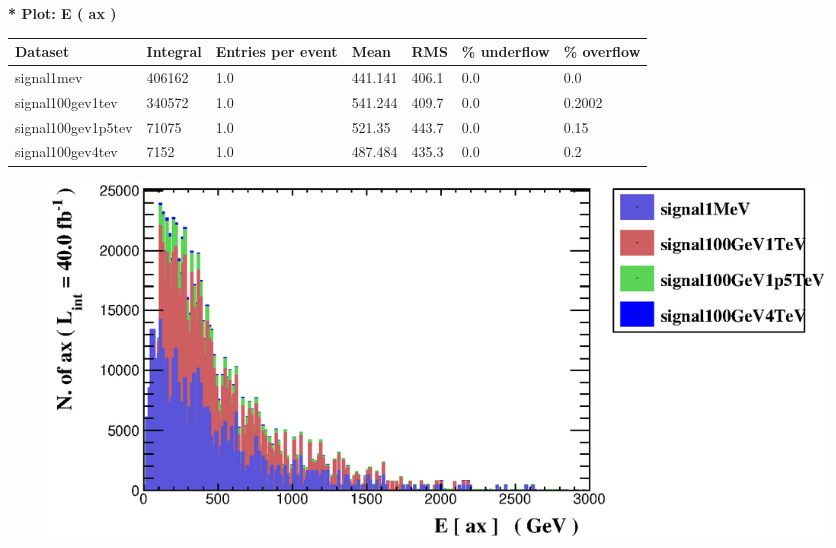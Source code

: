 \documentclass[a4paper, 10pt]{article}
\begin{document}
\textbf{* Plot: E ( ax ) }\\
   \begin{table}[H]
  \begin{center}
    \begin{tabular}{|m{23.0mm}|m{23.0mm}|m{18.0mm}|m{19.0mm}|m{19.0mm}|m{19.0mm}|m{19.0mm}|}
      \hline
      {\cellcolor{yellow}         Dataset}& {\cellcolor{yellow}         Integral}& {\cellcolor{yellow}         Entries per event}& {\cellcolor{yellow}         Mean}& {\cellcolor{yellow}         RMS}& {\cellcolor{yellow}         \% underflow}& {\cellcolor{yellow}         \% overflow}\\
      \hline
      {\cellcolor{white}         signal1mev}& {\cellcolor{white}         406162}& {\cellcolor{white}         1.0}& {\cellcolor{white}         441.141}& {\cellcolor{white}         406.1}& {\cellcolor{green}         0.0}& {\cellcolor{green}         0.0}\\
      \hline
      {\cellcolor{white}         signal100gev1tev}& {\cellcolor{white}         340572}& {\cellcolor{white}         1.0}& {\cellcolor{white}         541.244}& {\cellcolor{white}         409.7}& {\cellcolor{green}         0.0}& {\cellcolor{green}         0.2002}\\
      \hline
      {\cellcolor{white}         signal100gev1p5tev}& {\cellcolor{white}         71075}& {\cellcolor{white}         1.0}& {\cellcolor{white}         521.35}& {\cellcolor{white}         443.7}& {\cellcolor{green}         0.0}& {\cellcolor{green}         0.15}\\
      \hline
      {\cellcolor{white}         signal100gev4tev}& {\cellcolor{white}         7152}& {\cellcolor{white}         1.0}& {\cellcolor{white}         487.484}& {\cellcolor{white}         435.3}& {\cellcolor{green}         0.0}& {\cellcolor{green}         0.2}\\
\hline
    \end{tabular}
  \end{center}
\end{table}

\begin{figure}[H]
  \begin{center}
    \includegraphics[scale=0.45]{selection_0.eps}\\
\caption{   }
  \end{center}
\end{figure}
      \newpage
\end{document}
